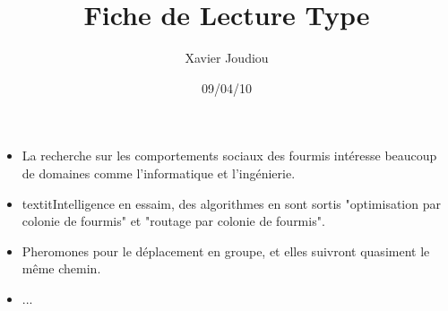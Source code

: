 \documentclass[11pt,a4paper]{article}
\title{Fiche de Lecture Type}
\author{Xavier Joudiou}
\date{09/04/10}
\begin{document}
	
  \begin{itemize}
  \renewcommand{\labelitemi}{$\Rightarrow$}
	\item La recherche sur les comportements sociaux des fourmis intéresse beaucoup de domaines comme l'informatique et l'ingénierie. 
	\item textit{Intelligence en essaim}, des algorithmes en sont sortis "optimisation par colonie de fourmis" et "routage par colonie de fourmis". 
	\item Pheromones pour le déplacement en groupe, et elles suivront quasiment le même chemin.
	\item ...
  \end{itemize}
\end{document}

